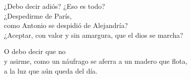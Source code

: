 \documentclass[12pt,twoside]{article}
\begin{document}
\begin{poem}
\begin{stanza}
\end{stanza}
\begin{stanza}
¿Debo decir adiós? ¿Eso es todo?\\
¿Despedirme de París,\\
como Antonio se despidió de Alejandría?\\
¿Aceptar, con valor y sin amargura, que el dios se marcha?
\end{stanza}
\begin{stanza}
O debo decir que no\\
y asirme, como un náufrago se aferra a un madero que flota,\\
a la luz que aún queda del día.
\end{stanza}
\end{poem}
\end{document}
